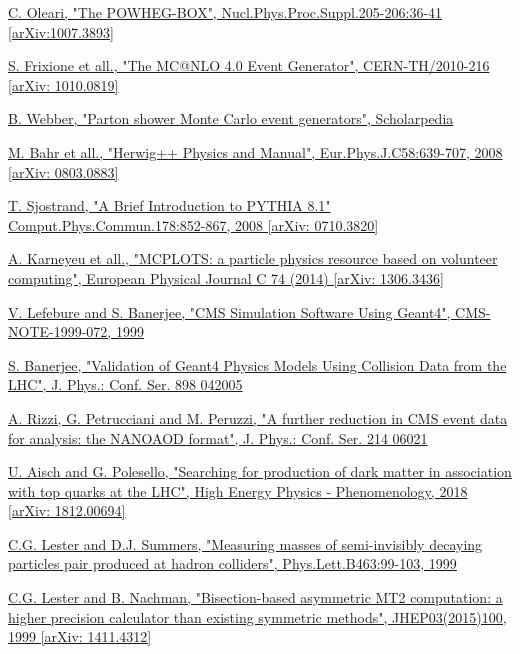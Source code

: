 \documentclass[a4paper, 10pt, openright]{report}
\begin{document}
\begin{thebibliography}{1}
\href{https://arxiv.org/abs/1007.3893}{C. Oleari,
"The POWHEG-BOX",
Nucl.Phys.Proc.Suppl.205-206:36-41 [arXiv:1007.3893]}

\href{https://arxiv.org/abs/1010.0819}{S. Frixione et all.,
"The MC@NLO 4.0 Event Generator",
CERN-TH/2010-216 [arXiv: 1010.0819]}

\href{http://www.scholarpedia.org/article/Parton_shower_Monte_Carlo_event_generators}{B. Webber,
"Parton shower Monte Carlo event generators",
Scholarpedia}

\href{https://arxiv.org/abs/0803.0883}{M. Bahr et all.,
"Herwig++ Physics and Manual",
Eur.Phys.J.C58:639-707, 2008 [arXiv: 0803.0883]}

\href{https://arxiv.org/abs/0710.3820}{T. Sjostrand,
"A Brief Introduction to PYTHIA 8.1"
Comput.Phys.Commun.178:852-867, 2008 [arXiv: 0710.3820]}

\href{https://arxiv.org/abs/1306.3436}{A. Karneyeu et all.,
"MCPLOTS: a particle physics resource based on volunteer computing",
European Physical Journal C 74 (2014) [arXiv: 1306.3436]}

\href{http://inspirehep.net/record/876352}{V. Lefebure and S. Banerjee,
"CMS Simulation Software Using Geant4",
CMS-NOTE-1999-072, 1999}

\href{https://iopscience.iop.org/article/10.1088/1742-6596/898/4/042005/pdf}{S. Banerjee,
"Validation of Geant4 Physics Models Using Collision Data from the LHC",
J. Phys.: Conf. Ser. 898 042005}

\href{https://www.researchgate.net/publication/335864848_A_further_reduction_in_CMS_event_data_for_analysis_the_NANOAOD_format}{A. Rizzi, G. Petrucciani and M. Peruzzi,
"A further reduction in CMS event data for analysis: the NANOAOD format",
J. Phys.: Conf. Ser. 214 06021}

\href{https://arxiv.org/abs/1812.00694}{U. Aisch and G. Polesello,
"Searching for production of dark matter in association with top quarks at the LHC",
High Energy Physics - Phenomenology, 2018 [arXiv: 1812.00694]}

\href{https://arxiv.org/abs/hep-ph/9906349}{C.G. Lester and D.J. Summers,
"Measuring masses of semi-invisibly decaying particles pair produced at hadron colliders",
Phys.Lett.B463:99-103, 1999}

\href{https://arxiv.org/abs/1411.4312}{C.G. Lester and B. Nachman,
"Bisection-based asymmetric MT2 computation: a higher precision calculator than existing symmetric methods",
JHEP03(2015)100, 1999 [arXiv: 1411.4312]}


\end{thebibliography}
\end{document}
